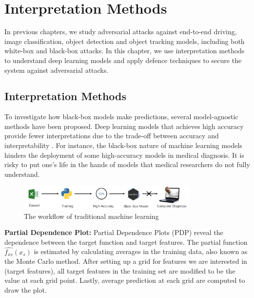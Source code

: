 \chapter{Interpretation Methods}
\label{chpt:defence}


In previous chapters, we study adversarial attacks against end-to-end driving, image classification, object detection and object tracking models, including both white-box and black-box attacks. In this chapter, we use interpretation methods to understand deep learning models and apply defence techniques to secure the system against adversarial attacks.

\section{Interpretation Methods}
\label{sec:interpret_deep_learn}

To investigate how black-box models make predictions, several model-agnostic methods have been proposed.
Deep learning models that achieves high accuracy provide fewer interpretations due to the trade-off between accuracy and interpretability \cite{doshivelez2017rigorous}. For instance, the black-box nature of machine learning models hinders the deployment of some high-accuracy models in medical diagnosis. It is risky to put one's life in the hands of models that medical researchers do not fully understand.

\begin{figure}[H]
\centering
\includegraphics[width=0.8\textwidth]{figures/chapter_defence/interpret.jpg}
\caption{The workflow of traditional machine learning}
\label{fig.interpret}
\end{figure}


\textbf{Partial Dependence Plot:} Partial Dependence Plots (PDP) reveal the dependence between the target function and target features. The partial function $ \hat{f_{xs}}(x_s) $ is estimated by calculating averages in the training data, also known as the Monte Carlo method. After setting up a grid for features we are interested in (target features), all target features in the training set are modified to be the value at each grid point. Lastly, average prediction at each grid are computed to draw the plot. 

